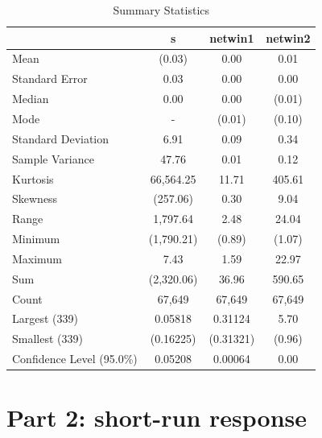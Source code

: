 \documentclass[11pt]{article}
\begin{document}
\begin{enumerate}
    \begin{table}[H]
        \centering
        \begin{tabular}{>{\raggedright\arraybackslash}p{4cm} c c c}
        \toprule
         & \textbf{s} & \textbf{netwin1} & \textbf{netwin2} \\
        \midrule
        Mean                   & (0.03)        & 0.00          & 0.01          \\
        Standard Error         & 0.03          & 0.00          & 0.00          \\
        Median                 & 0.00          & 0.00          & (0.01)        \\
        Mode                   & -             & (0.01)        & (0.10)        \\
        Standard Deviation     & 6.91          & 0.09          & 0.34          \\
        Sample Variance        & 47.76         & 0.01          & 0.12          \\
        Kurtosis               & 66,564.25     & 11.71         & 405.61        \\
        Skewness               & (257.06)      & 0.30          & 9.04          \\
        Range                  & 1,797.64      & 2.48          & 24.04         \\
        Minimum                & (1,790.21)    & (0.89)        & (1.07)        \\
        Maximum                & 7.43          & 1.59          & 22.97         \\
        Sum                    & (2,320.06)    & 36.96         & 590.65        \\
        Count                  & 67,649        & 67,649        & 67,649        \\
        Largest (339)          & 0.05818       & 0.31124       & 5.70          \\
        Smallest (339)         & (0.16225)     & (0.31321)     & (0.96)        \\
        Confidence Level (95.0\%) & 0.05208   & 0.00064       & 0.00          \\
        \bottomrule
        \end{tabular}
        \caption{Summary Statistics}
    \end{table}

\end{enumerate}

\section{Part 2: short-run response}
\end{document}
